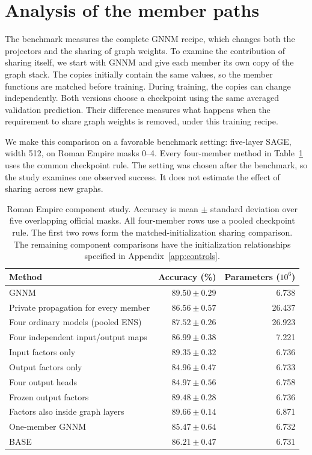 \documentclass{article}
\begin{document}
\section{Analysis of the member paths}\label{sec:analysis}
The benchmark measures the complete GNNM recipe, which changes both the projectors and the sharing of graph weights. To examine the contribution of sharing itself, we start with GNNM and give each member its own copy of the graph stack. The copies initially contain the same values, so the member functions are matched before training. During training, the copies can change independently. Both versions choose a checkpoint using the same averaged validation prediction. Their difference measures what happens when the requirement to share graph weights is removed, under this training recipe.

We make this comparison on a favorable benchmark setting: five-layer SAGE, width 512, on Roman Empire masks 0--4. Every four-member method in Table~\ref{tab:component-main} uses the common checkpoint rule. The setting was chosen after the benchmark, so the study examines one observed success. It does not estimate the effect of sharing across new graphs.

\begin{table}[t]
\centering\small
\setlength{\tabcolsep}{5pt}
\caption{Roman Empire component study. Accuracy is mean $\pm$ standard deviation over five overlapping official masks. All four-member rows use a pooled checkpoint rule. The first two rows form the matched-initialization sharing comparison. The remaining component comparisons have the initialization relationships specified in Appendix~\ref{app:controls}.}
\label{tab:component-main}
\begin{tabular}{lrr}
\toprule
Method & Accuracy (\%) & Parameters ($10^6$)\\
\midrule
GNNM & $89.50\pm0.29$ & 6.738\\
Private propagation for every member & $86.56\pm0.57$ & 26.437\\
\midrule
Four ordinary models (pooled ENS) & $87.52\pm0.26$ & 26.923\\
Four independent input/output maps & $86.99\pm0.38$ & 7.221\\
Input factors only & $89.35\pm0.32$ & 6.736\\
Output factors only & $84.96\pm0.47$ & 6.733\\
Four output heads & $84.97\pm0.56$ & 6.758\\
Frozen output factors & $89.48\pm0.28$ & 6.736\\
Factors also inside graph layers & $89.66\pm0.14$ & 6.871\\
One-member GNNM & $85.47\pm0.64$ & 6.732\\
BASE & $86.21\pm0.47$ & 6.731\\
\bottomrule
\end{tabular}
\end{table}
\end{document}
